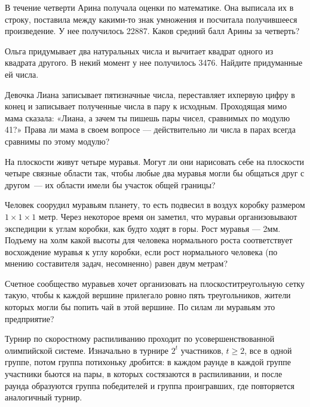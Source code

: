 \begin{itemize}
\itA В течение четверти Арина получала оценки по математике. Она выписала их в строку, поставила между какими-то знак умножения и посчитала получившееся произведение. У нее получилось 22887. Каков средний балл Арины за четверть?

\itB Ольга придумывает два натуральных числа и вычитает квадрат одного из квадрата другого. В некий момент у нее получилось 3476. Найдите придуманные ей числа.

\itC Девочка Лиана записывает пятизначные числа, переставляет их\linebreak первую цифру в конец и записывает полученные числа в пару к исходным. Проходящая мимо мама сказала: «Лиана, а зачем ты пишешь пары чисел, сравнимых по модулю 41?» Права ли мама в своем вопросе --- действительно ли числа в парах всегда сравнимы по этому модулю?
\end{itemize}

\begin{itemize}
\itA На плоскости живут четыре муравья. Могут ли они нарисовать себе на плоскости четыре связные области так, чтобы любые два муравья могли бы общаться друг с другом~— их области имели бы участок общей границы?

\itB Человек соорудил муравьям планету, то есть подвесил в воздух коробку размером $1 \times 1 \times 1$ метр. Через некоторое время он заметил, что муравьи организовывают экспедиции к углам коробки, как будто ходят в горы. Рост муравья — 2мм. Подъему на холм какой высоты для человека нормального роста соответствует восхождение муравья к углу коробки, если рост нормального человека (по мнению составителя задач, несомненно) равен двум метрам?

\itC Счетное сообщество муравьев хочет организовать на плоскости\linebreak треугольную сетку такую, чтобы к каждой вершине прилегало ровно пять треугольников, жители которых могли бы попить чай в этой вершине. По силам ли муравьям это предприятие?
\end{itemize}


Турнир по скоростному распиливанию проходит по усовершенствованной олимпийской системе. Изначально в турнире $2^t$ участников, $t \geq 2$, все в одной группе, потом группа потихоньку дробится: в каждом раунде в каждой группе участники бьются на пары, в которых состязаются в распиливании, и после раунда образуются группа победителей и группа проигравших, где повторяется аналогичный турнир.

